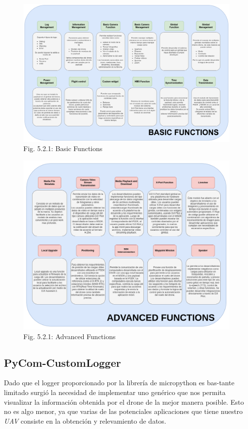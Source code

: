 \documentclass[12pt]{article}
\begin{document}
\begin{figure}
  \centering
  \includegraphics[width=\linewidth]{images/basic_function.png}
  \caption{Fig. 5.2.1: Basic Functions}
\end{figure}
\begin{figure}
  \centering
  \includegraphics[width=\linewidth]{images/advanced_function.png}
  \caption{Fig. 5.2.1: Advanced Functions}
\end{figure}

\FloatBarrier
\subsection{PyCom-CustomLogger}
Dado que el logger proporcionado por la librería de micropython es bas-tante limitado surgió la necesidad de implementar uno genérico que nos permita visualizar la información obtenida por el drone de la mejor manera posible. Esto no es algo menor, ya que varias de las potenciales aplicaciones que tiene nuestro \textit{UAV} consiste en la obtención y relevamiento de datos.
\end{document}
